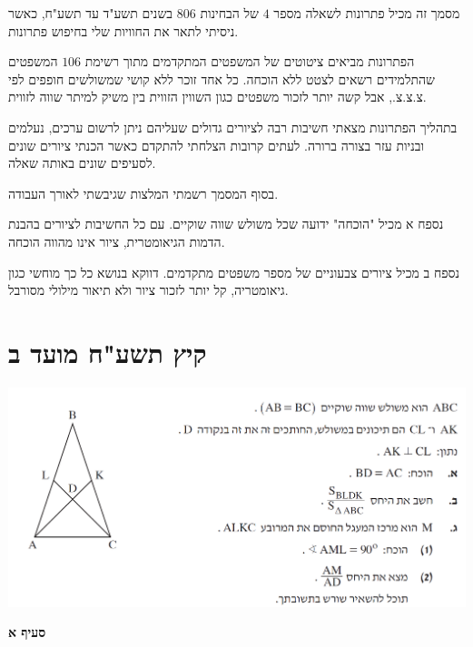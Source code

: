 \documentclass[12pt,a4paper]{article}
\begin{document}
מסמך זה מכיל פתרונות לשאלה מספר 
$4$
של הבחינות 
$806$
בשנים תשע"ד עד תשע"ח, כאשר ניסיתי לתאר את החוויות שלי בחיפוש פתרונות.

הפתרונות מביאים ציטוטים של המשפטים המתקדמים מתוך רשימת
$106$
המשפטים שהתלמידים רשאים לצטט ללא הוכחה. כל אחד זוכר ללא קושי שמשולשים חופפים לפי צ.צ.צ., אבל קשה יותר לזכור משפטים כגון השווין הזווית בין משיק למיתר שווה לזווית.

בתהליך הפתרונות מצאתי חשיבות רבה לציורים גדולים שעליהם ניתן לרשום ערכים, נעלמים ובניות עזר בצורה ברורה. לעתים קרובות הצלחתי להתקדם כאשר הכנתי ציורים שונים לסעיפים שונים באותה שאלה.

בסוף המסמך רשמתי המלצות שגיבשתי לאורך העבודה.

נספח א מכיל "הוכחה" ידועה שכל משולש שווה שוקיים. עם כל החשיבות לציורים בהבנת הדמות הגיאומטרית, ציור אינו מהווה הוכחה.

נספח ב מכיל ציורים צבעוניים של מספר משפטים מתקדמים. דווקא בנושא כל כך מוחשי כגון גיאומטריה, קל יותר לזכור ציור ולא תיאור מילולי מסורבל.




\newpage

\section{קיץ תשע"ח מועד ב}

\begin{center}
\includegraphics[width=\textwidth]{summer-2018b-4}
\end{center}
\vspace{-8mm}
\textbf{סעיף א}
\end{document}
